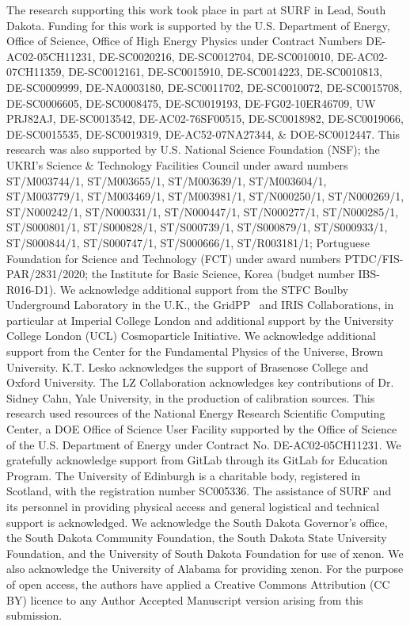 \documentclass[reprint, showpacs,
preprintnumbers,
amsmath,amssymb,
aps, floatfix,
superscriptaddress,
prd, nofootinbib]{revtex4-1}
\begin{document}
\begin{acknowledgments}
The research supporting this work took place in part at SURF in Lead, South Dakota. Funding for this work is supported by the U.S. Department of Energy, Office of Science, Office of High Energy Physics under Contract Numbers DE-AC02-05CH11231, DE-SC0020216, DE-SC0012704, DE-SC0010010, DE-AC02-07CH11359, DE-SC0012161, DE-SC0015910, DE-SC0014223, DE-SC0010813, DE-SC0009999, DE-NA0003180, DE-SC0011702, DE-SC0010072, DE-SC0015708, DE-SC0006605, DE-SC0008475, DE-SC0019193, DE-FG02-10ER46709, UW PRJ82AJ, DE-SC0013542, DE-AC02-76SF00515, DE-SC0018982, DE-SC0019066, DE-SC0015535, DE-SC0019319, DE-AC52-07NA27344, \& DOE-SC0012447.
This research was also supported by U.S. National Science Foundation (NSF); the UKRI’s Science \& Technology Facilities Council under award numbers ST/M003744/1, ST/M003655/1, ST/M003639/1, ST/M003604/1, ST/M003779/1, ST/M003469/1, ST/M003981/1, ST/N000250/1, ST/N000269/1, ST/N000242/1, ST/N000331/1, ST/N000447/1, ST/N000277/1, ST/N000285/1, ST/S000801/1, ST/S000828/1, ST/S000739/1, ST/S000879/1, ST/S000933/1, ST/S000844/1, ST/S000747/1, ST/S000666/1, ST/R003181/1; Portuguese Foundation for Science and Technology (FCT) under award numbers PTDC/FIS-PAR/2831/2020; the Institute for Basic Science, Korea (budget number IBS-R016-D1). 
We acknowledge additional support from the STFC Boulby Underground Laboratory in the U.K., the GridPP~\cite{faulkner2005gridpp,britton2009gridpp} and IRIS Collaborations, in particular at Imperial College London and additional support by the University College London (UCL) Cosmoparticle Initiative. 
We acknowledge additional support from the Center for the Fundamental Physics of the Universe, Brown University. 
K.T. Lesko acknowledges the support of Brasenose College and Oxford University. The LZ Collaboration acknowledges key contributions of Dr. Sidney Cahn, Yale University, in the production of calibration sources. 
This research used resources of the National Energy Research Scientific Computing Center, a DOE Office of Science User Facility supported by the Office of Science of the U.S. Department of Energy under Contract No. DE-AC02-05CH11231. We gratefully acknowledge support from GitLab through its GitLab for Education Program. 
The University of Edinburgh is a charitable body, registered in Scotland, with the registration number SC005336. 
The assistance of SURF and its personnel in providing physical access and general logistical and technical support is acknowledged. We acknowledge the South Dakota Governor's office, the South Dakota Community Foundation, the South Dakota State University Foundation, and the University of South Dakota Foundation for use of xenon.
We also acknowledge the University of Alabama for providing xenon.
For the purpose of open access, the authors have applied a Creative Commons Attribution (CC BY) licence to any Author Accepted Manuscript version arising from this submission.
\end{acknowledgments}
\end{document}
